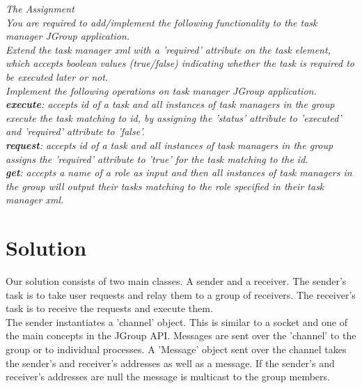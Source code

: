 \textit{The Assignment}\\

\textit{You are required to add/implement the following functionality to the task manager JGroup application.}\\

\textit{Extend the task manager xml with a 'required' attribute on the task element, which accepts boolean values (true/false) indicating whether the task is required to be executed later or not.}\\

\textit{Implement the following operations on task manager JGroup application.}\\

\textit{\textbf{execute}: accepts id of a task and all instances of task managers in the group execute the task matching to id, by assigning the 'status' attribute to 'executed' and 'required' attribute to 'false'.}\\

\textit{\textbf{request}: accepts id of a task and  all instances of task managers in the group assigns the 'required' attribute to 'true' for the task matching to the id.}\\

\textit{\textbf{get}: accepts a name of a role as input and then all instances of task managers in the group will output their tasks matching to the role specified in their task manager xml.}\\




\section{Solution}
\label{jgroup_solution}

Our solution consists of two main classes. A sender and a receiver. The sender's task is to take user requests and relay them to a group of receivers.
The receiver's task is to receive the requests and execute them. \\ 

The sender instantiates a 'channel' object. This is similar to a socket and one of the main concepts in the JGroup API. Messages are sent over the 'channel' to the group or to individual processes.  A 'Message' object sent over the channel takes the sender's and receiver's addresses as well as a message. If the sender's and receiver's addresses are null the message is multicast to the group members.\\

